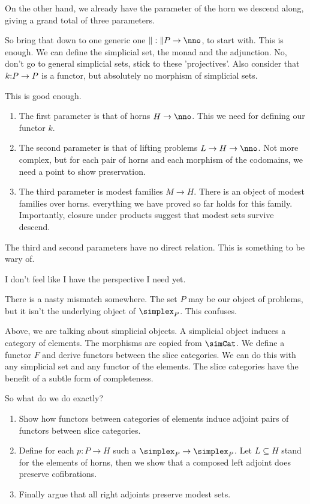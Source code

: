 \documentclass[csh.tex]{subfiles}
\begin{document}
On the other hand, we already have the parameter of the horn we descend along, giving a grand total of three parameters.

So bring that down to one generic one $\norm:P\to \nno$, to start with.
This is enough. We can define the simplicial set, the monad and the adjunction.
No, don't go to general simplicial sets, stick to these 'projectives'.
Also consider that $k\mathord : P\to P$ is a functor, but absolutely no morphism of simplicial sets.

This is good enough.
\begin{enumerate}
\item The first parameter is that of horns $H\to \nno$. This we need for defining our functor $k$.
\item The second parameter is that of lifting problems $L\to H\to \nno$. Not more complex, but for each pair of horns and each morphism of the codomains, we need a point to show preservation.
\item The third parameter is modest families $M\to H$. There is an object of modest families over horns. everything we have proved so far holds for this family. Importantly, closure under products suggest that modest sets survive descend.
\end{enumerate}
The third and second parameters have no direct relation. This is something to be wary of.

I don't feel like I have the perspective I need yet.

There is a nasty mismatch somewhere. The set $P$ may be our object of problems, but it isn't the underlying object of $\simplex_P$.
This confuses. 

Above, we are talking about simplicial objects. A simplicial object induces a category of elements. The morphisms are copied from $\simCat$. We define a functor $F$ and derive functors between the slice categories.
We can do this with any simplicial set and any functor of the elements. The slice categories have the benefit of a subtle form of completeness.

So what do we do exactly?
\begin{enumerate}
\item Show how functors between categories of elements induce adjoint pairs of functors between slice categories.
\item Define for each $p:P\to H$ such a $\simplex_P \to \simplex_P$. Let $L\subseteq H$ stand for the elements of horns, 
then we show that a composed left adjoint does preserve cofibrations.
\item Finally argue that all right adjoints preserve modest sets.
\end{enumerate}
\end{document}
